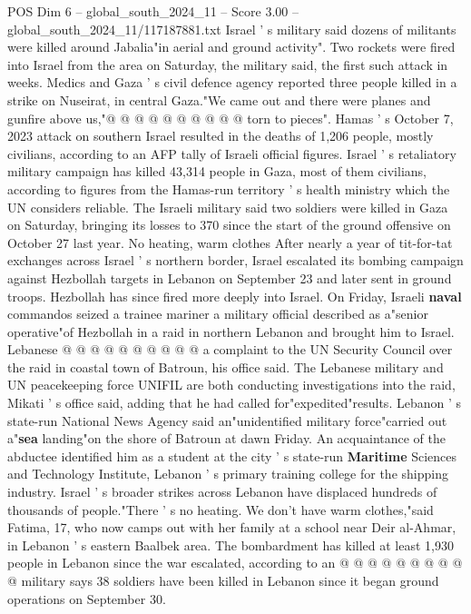\begin{textsample}{POS Dim 6 – global\_south\_2024\_11 – Score 3.00 – global\_south\_2024\_11/117187881.txt}
Israel ' s military said dozens of militants were killed around Jabalia"in aerial and ground activity".
Two rockets were fired into Israel from the area on Saturday, the military said, the first such attack in weeks.
Medics and Gaza ' s civil defence agency reported three people killed in a strike on Nuseirat, in central Gaza."We came out and there were planes and gunfire above us,"@ @ @ @ @ @ @ @ @ @ torn to pieces".
Hamas ' s October 7, 2023 attack on southern Israel resulted in the deaths of 1,206 people, mostly civilians, according to an AFP tally of Israeli official figures.
Israel ' s retaliatory military campaign has killed 43,314 people in Gaza, most of them civilians, according to figures from the Hamas-run territory ' s health ministry which the UN considers reliable.
The Israeli military said two soldiers were killed in Gaza on Saturday, bringing its losses to 370 since the start of the ground offensive on October 27 last year.
No heating, warm clothes After nearly a year of tit-for-tat exchanges across Israel ' s northern border, Israel escalated its bombing campaign against Hezbollah targets in Lebanon on September 23 and later sent in ground troops.
Hezbollah has since fired more deeply into Israel.
On Friday, Israeli \textbf{naval} commandos seized a trainee mariner a military official described as a"senior operative"of Hezbollah in a raid in northern Lebanon and brought him to Israel.
Lebanese @ @ @ @ @ @ @ @ @ @ a complaint to the UN Security Council over the raid in coastal town of Batroun, his office said.
The Lebanese military and UN peacekeeping force UNIFIL are both conducting investigations into the raid, Mikati ' s office said, adding that he had called for"expedited"results.
Lebanon ' s state-run National News Agency said an"unidentified military force"carried out a"\textbf{sea} landing"on the shore of Batroun at dawn Friday.
An acquaintance of the abductee identified him as a student at the city ' s state-run \textbf{Maritime} Sciences and Technology Institute, Lebanon ' s primary training college for the shipping industry.
Israel ' s broader strikes across Lebanon have displaced hundreds of thousands of people."There ' s no heating.
We don't have warm clothes,"said Fatima, 17, who now camps out with her family at a school near Deir al-Ahmar, in Lebanon ' s eastern Baalbek area.
The bombardment has killed at least 1,930 people in Lebanon since the war escalated, according to an @ @ @ @ @ @ @ @ @ @ military says 38 soldiers have been killed in Lebanon since it began ground operations on September 30.

\end{textsample}
